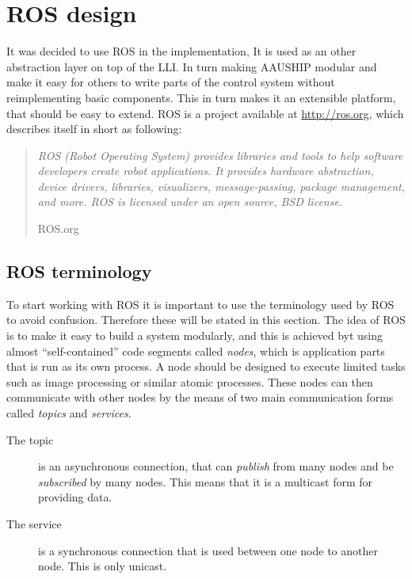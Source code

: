 \chapter{\acs{ROS} design}

It was decided to use \ac{ROS} in the implementation, It is used as an
other abstraction layer on top of the \ac{LLI}. In turn making AAUSHIP
modular and make it easy for others to write parts of the control
system without reimplementing basic components. This in turn makes it
an extensible platform, that should be easy to extend. \ac{ROS} is a
project available at \url{http://ros.org}, which describes itself in
short as following:

\begin{quote}
\textit{\noindent
	ROS (Robot Operating System) provides libraries and
	tools to help software developers create robot applications. It
	provides hardware abstraction, device drivers, libraries,
	visualizers, message-passing, package management, and more. ROS is
	licensed under an open source, BSD license.
}
		
	\hfill ROS.org
\end{quote}

\section{\acs{ROS} terminology}
To start working with \ac{ROS} it is important to use the terminology
used by \ac{ROS} to avoid confusion. Therefore these  will be stated
in this section.  The idea of \ac{ROS} is to make it easy to build a
system modularly, and this is achieved byt using almost
``self-contained'' code segments called \textit{nodes}, which is
application parts that is run as its own process. A node should be
designed to execute limited tasks such as image processing or similar
atomic processes. These nodes can then communicate with other nodes by
the means of two main communication forms called \textit{topics} and
\textit{services}.

\begin{description}
\item[The topic] is an asynchronous connection, that can \textit{publish}
from many nodes and be \textit{subscribed} by many nodes. This means
that it is a multicast form for providing data.
\item[The service] is a synchronous connection that is used between one node
to another node. This is only unicast.
\end{description}

